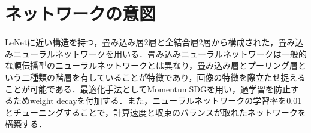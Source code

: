 \documentclass[a4paper, 12pt, dvipdfmx]{jarticle}
\begin{document}
\section{ネットワークの意図}
LeNetに近い構造を持つ，畳み込み層2層と全結合層2層から構成された，畳み込みニューラルネットワークを用いる．畳み込みニューラルネットワークは一般的な順伝播型のニューラルネットワークとは異なり，畳み込み層とプーリング層という二種類の階層を有していることが特徴であり，画像の特徴を際立たせ捉えることが可能である．最適化手法としてMomentumSDGを用い，過学習を防止するためweight decayを付加する．また，ニューラルネットワークの学習率を0.01とチューニングすることで，計算速度と収束のバランスが取れたネットワークを構築する．
\end{document}
